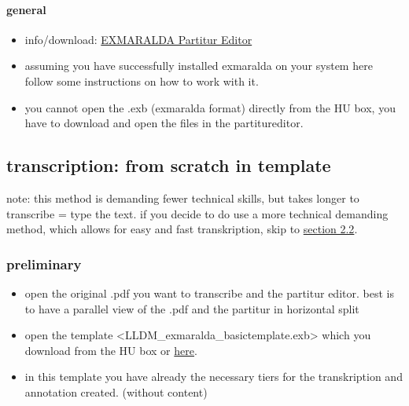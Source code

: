 \documentclass[
  12pt,
]{article}
\providecommand{\tightlist}{%
  \setlength{\itemsep}{0pt}\setlength{\parskip}{0pt}}
\begin{document}
\hypertarget{general}{%
\paragraph{general}\label{general}}

\begin{itemize}
\tightlist
\item
  info/download:
  \href{https://exmaralda.org/de/partitur-editor-de/}{EXMARALDA Partitur
  Editor}
\item
  assuming you have successfully installed exmaralda on your system here
  follow some instructions on how to work with it.
\item
  you cannot open the .exb (exmaralda format) directly from the HU box,
  you have to download and open the files in the partitureditor.
\end{itemize}

\hypertarget{transcription-from-scratch-in-template}{%
\subsection{transcription: from scratch in
template}\label{transcription-from-scratch-in-template}}

note: this method is demanding fewer technical skills, but takes longer
to transcribe = type the text. if you decide to do use a more technical
demanding method, which allows for easy and fast transkription, skip to
\href{e1_exmaralda-022.md}{section 2.2}.

\hypertarget{preliminary}{%
\subsubsection{preliminary}\label{preliminary}}

\begin{itemize}
\tightlist
\item
  open the original .pdf you want to transcribe and the partitur editor.
  best is to have a parallel view of the .pdf and the partitur in
  horizontal split
\item
  open the template
  \textless LLDM\_exmaralda\_basictemplate.exb\textgreater{} which you
  download from the HU box or
  \href{https://github.com/esteeschwarz/HU-LX/blob/main/trans/LLDM_exmaralda_basictemplate.exb}{here}.
\item
  in this template you have already the necessary tiers for the
  transkription and annotation created. (without content)
\end{itemize}
\end{document}
